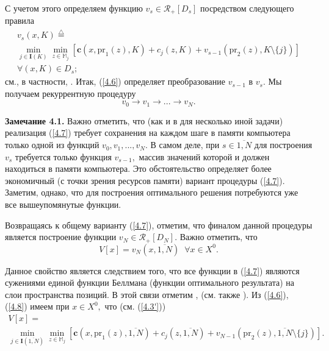 \documentclass[10pt]{SPIIRAS_Proceedings}
\begin{document}
С учетом этого определяем функцию
$v_s \in \mathcal{R}_+[D_s]$
посредством следующего правила
\begin{multline}
  \label{4.6}
  v_s(x,K) \stackrel{\triangle}{=} \\
  \min\limits_{j \in \mathbf{I}(K)} \min\limits_{z \in \mathbb{M}_j}
  [\mathbf{c}(x,\mathrm{pr}_1(z),K) + c_j(z,K) + v_{s-1}(\mathrm{pr}_2(z),K \setminus \{j\})] \\
  \forall{(x,K)} \in D_s;
\end{multline}
см., в частности,
\cite[(4.3.13)]{4}.
Итак, (\ref{4.6})
определяет преобразование $v_{s-1}$ в $v_s.$
Мы получаем рекуррентную процедуру
\begin{equation}\label{4.7}
  v_0 \longrightarrow v_1 \longrightarrow ... \longrightarrow v_N.
\end{equation}

{\bf Замечание 4.1.}
Важно отметить, что (как и в \cite{22} для несколько иной задачи)
реализация (\ref{4.7}) требует сохранения на каждом шаге в памяти компьютера только одной из функций
$v_0,v_1,...,v_N.$
В самом деле, при
$s \in \overline{1,N}$
для построения $v_s$ требуется только функция $v_{s-1},$
массив значений которой и должен находиться в памяти компьютера.
Это обстоятельство определяет более экономичный
(с точки зрения ресурсов памяти)
вариант процедуры (\ref{4.7}).
Заметим, однако, что для построения оптимального решения потребуются уже все вышеупомянутые функции.

Возвращаясь к общему варианту (\ref{4.7}),
отметим, что финалом данной процедуры является построение функции
$v_N \in \mathcal{R}_+[D_N].$
Важно отметить, что
\begin{equation}\label{4.8}
  V[x] = v_N(x,\overline{1,N})\;\;\forall{x} \in X^0.
\end{equation}

Данное свойство является следствием того,
что все функции в (\ref{4.7}) являются сужениями единой функции Беллмана
(функции оптимального результата)
на слои пространства позиций.
В этой связи отметим \cite[$\S$4.9]{14}, \cite{18}
(см. также \cite[(4.3.1)]{4}).
Из (\ref{4.6}), (\ref{4.8})
имеем при
$x \in X^0,$ что (см. (\ref{4.3'}))
\begin{multline}
  \label{4.9'}
  V[x] = \\
  \min\limits_{j \in \mathbf{I}(\overline{1,N})} \min\limits_{z \in \mathbb{M}_j}
  [\mathbf{c}(x,\mathrm{pr}_1(z),\overline{1,N}) + c_j(z,\overline{1,N}) + v_{N-1}(\mathrm{pr}_2(z),\overline{1,N} \setminus \{j\})].
\end{multline}
\end{document}
